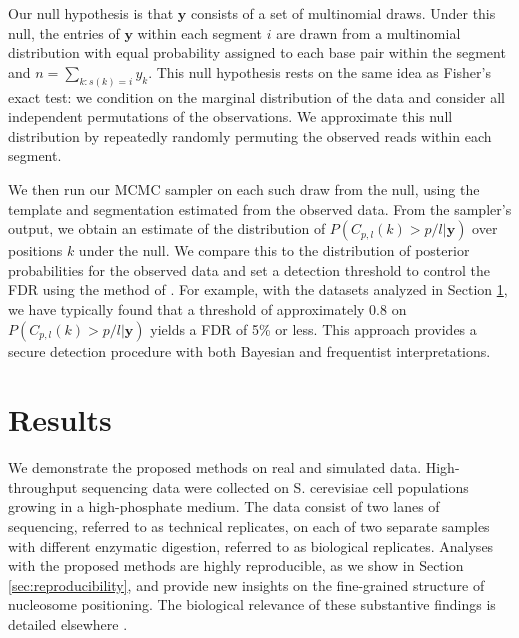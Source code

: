 Our null hypothesis is that $\bm y$ consists of a set of multinomial draws.
Under this null, the entries of $\bm y$ within each segment $i$ are drawn from a multinomial distribution with equal probability assigned to each base pair within the segment and $n = \sum_{k : s(k) = i} y_{k}$.
This null hypothesis rests on the same idea as Fisher's exact test: we condition on the marginal distribution of the data and consider all independent permutations of the observations. 
We approximate this null distribution by repeatedly randomly permuting the observed reads within each segment.

We then run our MCMC sampler on each such draw from the null, using the template and segmentation estimated from the observed data.
From the sampler's output, we obtain an estimate of the distribution of $P(C_{p,l}(k) > p / l | \bm y)$ over positions $k$ under the null.
We compare this to the distribution of posterior probabilities for the observed data and set a detection threshold to control the FDR using the method of \citet{StoreyTibshirani2003}.
For example, with the datasets analyzed in Section \ref{sec:results}, we have typically found that a threshold of approximately $0.8$ on $P(C_{p,l}(k) > p / l | \bm y)$ yields a FDR of 5\% or less.
This approach provides a secure detection procedure with both Bayesian and frequentist interpretations.


\section{Results}
\label{sec:results}

We demonstrate the proposed methods on  real and simulated data.
%
High-throughput sequencing data were collected on S. cerevisiae cell populations growing in a high-phosphate medium.
The data consist of two lanes of sequencing, referred to as technical replicates, on each of two separate samples with different enzymatic digestion, referred to as biological replicates.
Analyses with the proposed methods are highly reproducible, as we show in Section \ref{sec:reproducibility}, and provide new insights on the fine-grained structure of nucleosome positioning.
The biological relevance of these substantive findings is detailed elsewhere \citep{Xu:Alex:Edo:Erin:2011}.

